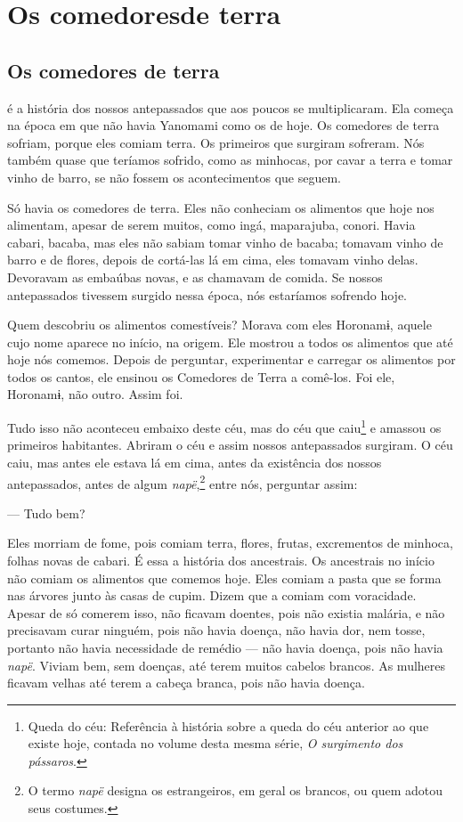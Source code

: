 \part[Os comedores de terra]{Os comedores\break de terra}

\chapter{Os comedores de terra}

 é a história dos nossos antepassados que aos poucos se
multiplicaram. Ela começa na época em que não havia Yanomami como os de
hoje. Os comedores de terra sofriam, porque eles comiam terra. Os
primeiros que surgiram sofreram. Nós também quase que teríamos sofrido,
como as minhocas, por cavar a terra e tomar vinho de barro, se não
fossem os acontecimentos que seguem. 

Só havia os comedores de terra. Eles não conheciam os alimentos que hoje
nos alimentam, apesar de serem muitos, como ingá, maparajuba,
conori. Havia cabari, bacaba, mas eles não sabiam tomar vinho de
bacaba; tomavam vinho de barro e de flores, depois de cortá-las lá em
cima, eles tomavam vinho delas. Devoravam as embaúbas novas, e as
chamavam de comida. Se nossos antepassados tivessem surgido nessa época,
nós estaríamos sofrendo hoje. 

Quem descobriu os alimentos comestíveis? Morava com eles Horonamɨ,
aquele cujo nome aparece no início, na origem. Ele mostrou a todos os
alimentos que até hoje nós comemos. Depois de perguntar, experimentar e
carregar os alimentos por todos os cantos, ele ensinou os Comedores de
Terra a comê-los. Foi ele, Horonamɨ, não outro. Assim foi.

Tudo isso não aconteceu embaixo deste céu, mas do céu que caiu\footnote{Queda do céu: Referência à história sobre a queda do céu anterior ao que existe hoje, contada no volume desta mesma série, \textit{O surgimento dos pássaros}.} e amassou
os primeiros habitantes. Abriram o céu e assim nossos antepassados
surgiram. O céu caiu, mas antes ele estava lá em cima, antes da
existência dos nossos antepassados, antes de algum \textit{napë},\footnote{O termo \textit{napë} designa os estrangeiros, em geral os brancos, ou quem adotou seus costumes.} entre
nós, perguntar assim:

--- Tudo bem? 

Eles morriam de fome, pois comiam terra, flores, frutas,
excrementos de minhoca, folhas novas de cabari. É essa a história dos
ancestrais. Os ancestrais no início não comiam os alimentos que comemos
hoje. Eles comiam a pasta que se forma nas árvores junto às casas de
cupim. Dizem que a comiam com voracidade. Apesar de só comerem isso, não
ficavam doentes, pois não existia malária, e não precisavam curar
ninguém, pois não havia doença, não havia dor, nem tosse, portanto não
havia necessidade de remédio --- não havia doença, pois não
havia \textit{napë}. Viviam bem, sem doenças, até terem muitos cabelos
brancos. As mulheres ficavam velhas até terem a cabeça branca, pois não
havia doença. 

